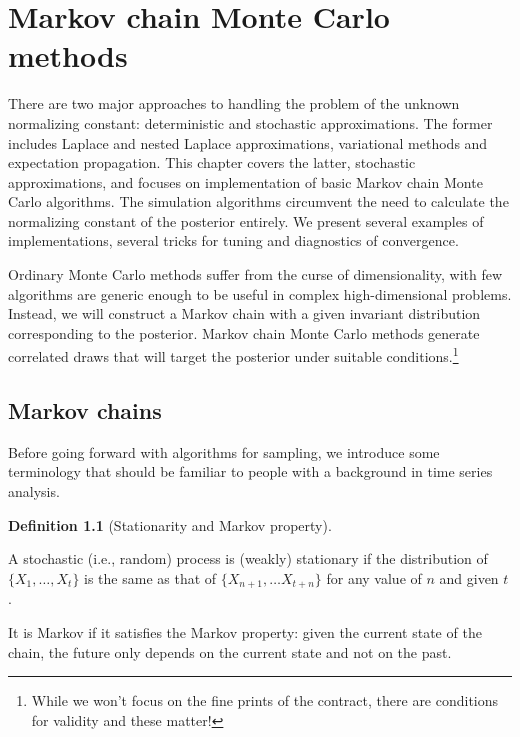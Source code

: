 \documentclass[
  11pt,
  letterpaper,
]{scrbook}
\theoremstyle{definition}
\theoremstyle{plain}
\theoremstyle{plain}
\theoremstyle{definition}
\theoremstyle{definition}
\newtheorem{definition}{Definition}[chapter]
\theoremstyle{remark}
\begin{document}

\chapter{Markov chain Monte Carlo
methods}\label{markov-chain-monte-carlo-methods}

There are two major approaches to handling the problem of the unknown
normalizing constant: deterministic and stochastic approximations. The
former includes Laplace and nested Laplace approximations, variational
methods and expectation propagation. This chapter covers the latter,
stochastic approximations, and focuses on implementation of basic Markov
chain Monte Carlo algorithms. The simulation algorithms circumvent the
need to calculate the normalizing constant of the posterior entirely. We
present several examples of implementations, several tricks for tuning
and diagnostics of convergence.

Ordinary Monte Carlo methods suffer from the curse of dimensionality,
with few algorithms are generic enough to be useful in complex
high-dimensional problems. Instead, we will construct a Markov chain
with a given invariant distribution corresponding to the posterior.
Markov chain Monte Carlo methods generate correlated draws that will
target the posterior under suitable conditions.\footnote{While we won't
  focus on the fine prints of the contract, there are conditions for
  validity and these matter!}

\section{Markov chains}\label{markov-chains}

Before going forward with algorithms for sampling, we introduce some
terminology that should be familiar to people with a background in time
series analysis.

\begin{definition}[Stationarity and Markov
property]\protect\hypertarget{def-weak-stationarity}{}\label{def-weak-stationarity}

A stochastic (i.e., random) process is (weakly) stationary if the
distribution of \(\{X_1, \ldots, X_t\}\) is the same as that of
\(\{X_{n+1}, \ldots X_{t+n}\}\) for any value of \(n\) and given \(t\).

It is Markov if it satisfies the Markov property: given the current
state of the chain, the future only depends on the current state and not
on the past.

\end{definition}
\end{document}
